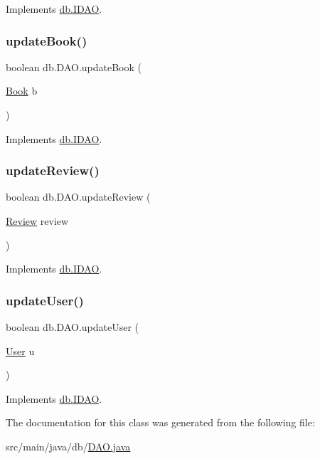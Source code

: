 Implements \hyperlink{interfacedb_1_1_i_d_a_o_a5b1f408c9a25305e977e962faa38b026}{db.\+I\+D\+AO}.

\mbox{\label{classdb_1_1_d_a_o_a4ea10c177ef93a3084ed74b38556adca}} 
\subsubsection{\texorpdfstring{update\+Book()}{updateBook()}}
{\footnotesize\ttfamily boolean db.\+D\+A\+O.\+update\+Book (\begin{DoxyParamCaption}\item[{\hyperlink{classserver_1_1data_1_1_book}{Book}}]{b }\end{DoxyParamCaption})}



Implements \hyperlink{interfacedb_1_1_i_d_a_o_a202354d7a3e1231687d543e82c15a6f5}{db.\+I\+D\+AO}.

\mbox{\label{classdb_1_1_d_a_o_ab73940ac7600902ea7d52bcd041a9c6e}} 
\subsubsection{\texorpdfstring{update\+Review()}{updateReview()}}
{\footnotesize\ttfamily boolean db.\+D\+A\+O.\+update\+Review (\begin{DoxyParamCaption}\item[{\hyperlink{classserver_1_1data_1_1_review}{Review}}]{review }\end{DoxyParamCaption})}



Implements \hyperlink{interfacedb_1_1_i_d_a_o_a7288e76ee3ce667c0d0d7ecaeef0d94e}{db.\+I\+D\+AO}.

\mbox{\label{classdb_1_1_d_a_o_a5cd4462deb77065c2d12471cd73b3ec8}} 
\subsubsection{\texorpdfstring{update\+User()}{updateUser()}}
{\footnotesize\ttfamily boolean db.\+D\+A\+O.\+update\+User (\begin{DoxyParamCaption}\item[{\hyperlink{classserver_1_1data_1_1_user}{User}}]{u }\end{DoxyParamCaption})}



Implements \hyperlink{interfacedb_1_1_i_d_a_o_adbc5f00b7bcdffb6692367a3c9564193}{db.\+I\+D\+AO}.



The documentation for this class was generated from the following file\+:\begin{DoxyCompactItemize}
\item 
src/main/java/db/\hyperlink{_d_a_o_8java}{D\+A\+O.\+java}\end{DoxyCompactItemize}
